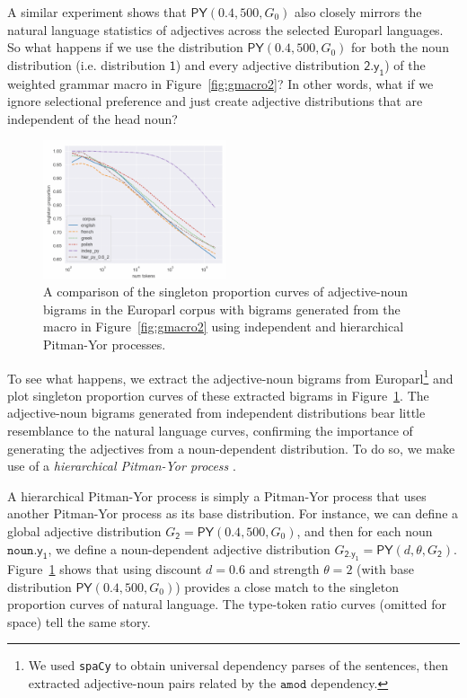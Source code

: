 \documentclass[11pt,a4paper]{article}
\renewcommand{\bnfpn}[1]{\mathsf{#1}}
\renewcommand{\bnfts}[1]{\mathtt{#1}}
\begin{document}
A similar experiment shows that $\mathsf{PY}(0.4, 500, G_0)$ also closely mirrors the natural language statistics of adjectives across the selected Europarl languages. So what happens if we use the distribution $\mathsf{PY}(0.4, 500, G_0)$ for both the noun distribution (i.e. distribution $\bnfpn{1}$) and every adjective distribution $\bnfpn{2.y_1}$) of the weighted grammar macro in Figure~\ref{fig:gmacro2}? In other words, what if we ignore selectional preference and just create adjective distributions that are independent of the head noun?

\begin{figure}[t]
\centering
\includegraphics[width=0.48\textwidth]{images/sp3.png}
\caption{A comparison of the singleton proportion curves of adjective-noun bigrams in the Europarl corpus with bigrams generated from the macro in Figure~\ref{fig:gmacro2} using independent and hierarchical Pitman-Yor processes.}
\label{fig:sp3}
\end{figure}


To see what happens, we extract the adjective-noun bigrams from Europarl\footnote{We used \texttt{spaCy} to obtain universal dependency parses \cite{de-marneffe-etal-2014-universal} of the sentences, then extracted adjective-noun pairs related by the $\texttt{amod}$ dependency.} and plot singleton proportion curves of these extracted bigrams in Figure~\ref{fig:sp3}. The adjective-noun bigrams generated from independent distributions bear little resemblance to the natural language curves, confirming the importance of generating the adjectives from a noun-dependent distribution. To do so, we make use of a \emph{hierarchical Pitman-Yor process} \cite{teh-2006-hierarchical}.

A hierarchical Pitman-Yor process is simply a Pitman-Yor process that uses another Pitman-Yor process as its base distribution. For instance, we can define a global adjective distribution $G_\mathsf{2} = \mathsf{PY}(0.4, 500, G_0)$, and then for each noun $\bnfts{noun}.\bnfpn{y_1}$, we define a noun-dependent adjective distribution $G_\mathsf{\bnfpn{2.y_1}} = \mathsf{PY}(d, \theta, G_\bnfpn{2})$. Figure~\ref{fig:sp3} shows that using discount $d=0.6$ and strength $\theta=2$ (with base distribution $\mathsf{PY}(0.4, 500, G_0)$) provides a close match to the singleton proportion curves of natural language. The type-token ratio curves (omitted for space) tell the same story. 
\end{document}
